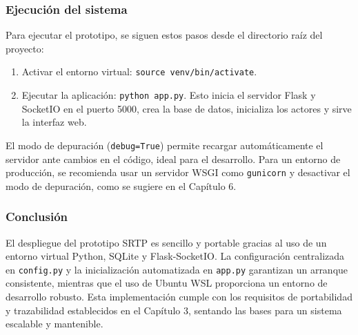 \subsubsection{Ejecución del sistema}

Para ejecutar el prototipo, se siguen estos pasos desde el directorio raíz del proyecto:

\begin{enumerate}
    \item Activar el entorno virtual: \texttt{source venv/bin/activate}.
    \item Ejecutar la aplicación: \texttt{python app.py}. Esto inicia el servidor Flask y SocketIO en el puerto 5000, crea la base de datos, inicializa los actores y sirve la interfaz web.
\end{enumerate}

El modo de depuración (\texttt{debug=True}) permite recargar automáticamente el servidor ante cambios en el código, ideal para el desarrollo. Para un entorno de producción, se recomienda usar un servidor WSGI como \texttt{gunicorn} y desactivar el modo de depuración, como se sugiere en el Capítulo 6.

\subsubsection{Conclusión}

El despliegue del prototipo SRTP es sencillo y portable gracias al uso de un entorno virtual Python, SQLite y Flask-SocketIO. La configuración centralizada en \texttt{config.py} y la inicialización automatizada en \texttt{app.py} garantizan un arranque consistente, mientras que el uso de Ubuntu WSL proporciona un entorno de desarrollo robusto. Esta implementación cumple con los requisitos de portabilidad y trazabilidad establecidos en el Capítulo 3, sentando las bases para un sistema escalable y mantenible.
